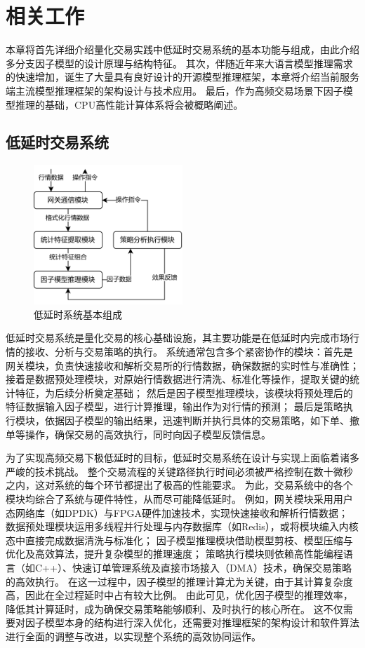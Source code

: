 \chapter{相关工作}


本章将首先详细介绍量化交易实践中低延时交易系统的基本功能与组成，由此介绍多分支因子模型的设计原理与结构特征。
其次，伴随近年来大语言模型推理需求的快速增加，诞生了大量具有良好设计的开源模型推理框架，本章将介绍当前服务端主流模型推理框架的架构设计与技术应用。
最后，作为高频交易场景下因子模型推理的基础，CPU高性能计算体系将会被概略阐述。

\section{低延时交易系统}

\begin{figure}
    \centering
    \includegraphics[width=0.5\textwidth]{image/chap02/低延时.png}
    \caption{低延时系统基本组成}
    \label{fig:image-embedding-text}
\end{figure}
低延时交易系统是量化交易的核心基础设施，其主要功能是在低延时内完成市场行情的接收、分析与交易策略的执行。
系统通常包含多个紧密协作的模块：首先是网关模块，负责快速接收和解析交易所的行情数据，确保数据的实时性与准确性；
接着是数据预处理模块，对原始行情数据进行清洗、标准化等操作，提取关键的统计特征，为后续分析奠定基础；
然后是因子模型推理模块，该模块将预处理后的特征数据输入因子模型，进行计算推理，输出作为对行情的预测；
最后是策略执行模块，依据因子模型的输出结果，迅速判断并执行具体的交易策略，如下单、撤单等操作，确保交易的高效执行，同时向因子模型反馈信息。

为了实现高频交易下极低延时的目标，低延时交易系统在设计与实现上面临着诸多严峻的技术挑战。
整个交易流程的关键路径执行时间必须被严格控制在数十微秒之内，这对系统的每个环节都提出了极高的性能要求。
为此，交易系统中的各个模块均综合了系统与硬件特性，从而尽可能降低延时。
例如，网关模块采用用户态网络库（如DPDK）与FPGA硬件加速技术，实现快速接收和解析行情数据；
数据预处理模块运用多线程并行处理与内存数据库（如Redis），或将模块编入内核态中直接完成数据清洗与标准化；
因子模型推理模块借助模型剪枝、模型压缩与优化及高效算法，提升复杂模型的推理速度；
策略执行模块则依赖高性能编程语言（如C++）、快速订单管理系统及直接市场接入（DMA）技术，确保交易策略的高效执行。
在这一过程中，因子模型的推理计算尤为关键，由于其计算复杂度高，因此在全过程延时中占有较大比例。
由此可见，优化因子模型的推理效率，降低其计算延时，成为确保交易策略能够顺利、及时执行的核心所在。
这不仅需要对因子模型本身的结构进行深入优化，还需要对推理框架的架构设计和软件算法进行全面的调整与改进，以实现整个系统的高效协同运作。



